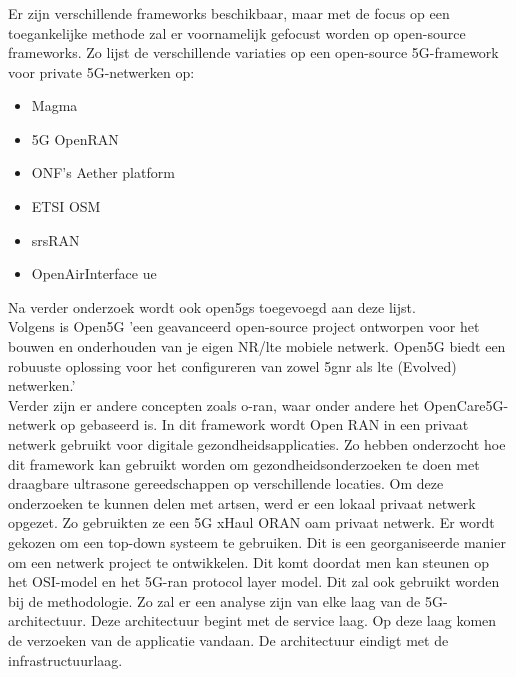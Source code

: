 \subsubsection{}
\label{framework}

Er zijn verschillende frameworks beschikbaar, maar met de focus op een toegankelijke methode zal er voornamelijk gefocust worden op open-source frameworks. Zo lijst \textcite{Eswaran2022} de verschillende variaties op een open-source 5G-framework voor private 5G-netwerken op:

\begin{itemize}
  \item Magma
  \item 5G OpenRAN
  \item ONF's Aether platform
  \item ETSI OSM
  \item \gls{srsRAN}
  \item OpenAirInterface \gls{ue}
\end{itemize}

Na verder onderzoek wordt ook \gls{open5gs} toegevoegd aan deze lijst.\\

Volgens \textcite{Open5GS2024} is Open5G 'een geavanceerd open-source project ontworpen voor het bouwen en onderhouden van je eigen NR/\gls{lte} mobiele netwerk. Open5G biedt een robuuste oplossing voor het configureren van zowel \gls{5gnr} als \gls{lte} (Evolved) netwerken.' \\ Verder zijn er andere concepten zoals \gls{o-ran}, waar onder andere het OpenCare5G-netwerk op gebaseerd is. In dit framework wordt Open RAN in een privaat netwerk gebruikt voor digitale gezondheidsapplicaties. Zo hebben \textcite{de2023opencare5g} onderzocht hoe dit framework kan gebruikt worden om gezondheidsonderzoeken te doen met draagbare ultrasone gereedschappen op verschillende locaties. Om deze onderzoeken te kunnen delen met artsen, werd er een lokaal privaat netwerk opgezet. Zo gebruikten ze een 5G xHaul ORAN \gls{oam} privaat netwerk. Er wordt gekozen om een top-down systeem te gebruiken. Dit is een georganiseerde manier om een netwerk project te ontwikkelen. Dit komt doordat men kan steunen op het OSI-model en het 5G-\gls{ran} protocol layer model. Dit zal ook gebruikt worden bij de methodologie. Zo zal er een analyse zijn van elke laag van de 5G-architectuur. Deze architectuur begint met de service laag. Op deze laag komen de verzoeken van de applicatie vandaan. De architectuur eindigt met de infrastructuurlaag. \autocite{de2023opencare5g}

